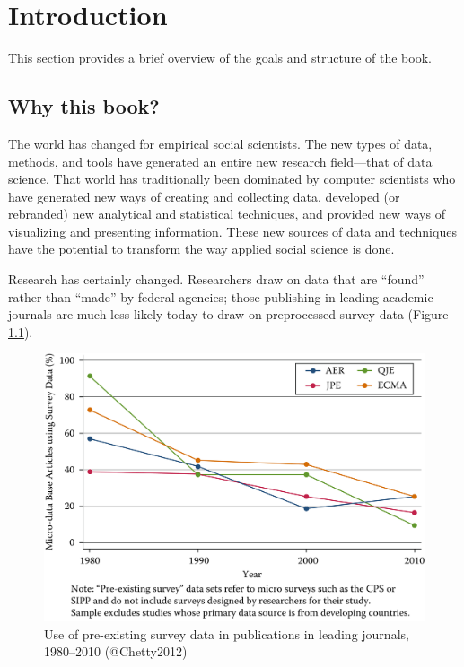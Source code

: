 \documentclass[]{krantz}
\begin{document}
\hypertarget{chap:intro}{\chapter{Introduction}\label{chap:intro}}

This section provides a brief overview of the goals and structure of the
book.

\section{Why this book?}\label{sec:1-1}

The world has changed for empirical social scientists. The new types of
data, methods, and tools have generated an entire new research
field---that of data science. That world has traditionally been
dominated by computer scientists who have generated new ways of creating
and collecting data, developed (or rebranded) new analytical and
statistical techniques, and provided new ways of visualizing and
presenting information. These new sources of data and techniques have
the potential to transform the way applied social science is done.

Research has certainly changed. Researchers draw on data that are
``found'' rather than ``made'' by federal agencies; those publishing in
leading academic journals are much less likely today to draw on
preprocessed survey data (Figure \ref{fig:fig1}).

\begin{figure}

{\centering \includegraphics[width=0.7\linewidth]{ChapterIntro/figures/Figure1} 

}

\caption{Use of pre-existing survey data in publications in leading journals, 1980--2010 (@Chetty2012)}\label{fig:fig1}
\end{figure}
\end{document}
